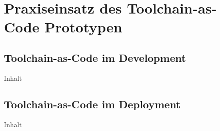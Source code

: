 \section{Praxiseinsatz des Toolchain-as-Code Prototypen}
\label{sec:06-03_practical-use-of-the-toolchain-as-code-prototype}

\subsection{Toolchain-as-Code im Development}
\label{subsec:06-03-01_toolchain-as-code-in-development}

Inhalt

\subsection{Toolchain-as-Code im Deployment}
\label{subsec:06-03-02_toolchain-as-code-in-deployment}

Inhalt
